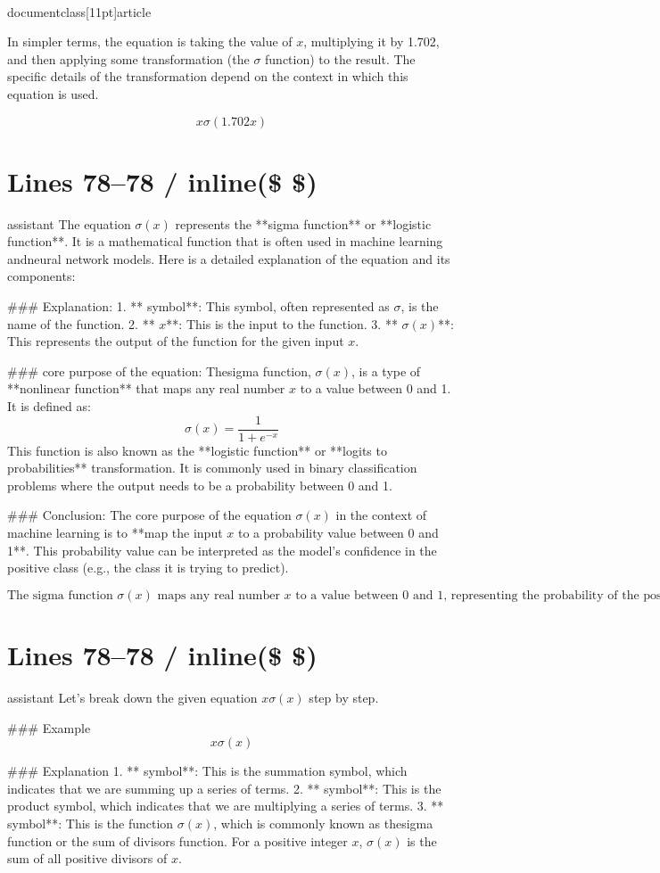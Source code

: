 \\documentclass[11pt]{article}
\begin{document}
In simpler terms, the equation is taking the value of \( x \), multiplying it by 1.702, and then applying some transformation (the \(\sigma\) function) to the result. The specific details of the transformation depend on the context in which this equation is used.

\[
\boxed{x \sigma(1.702 x)}
\]


\section*{Lines 78–78 / inline(\$ \$) }
assistant
The equation \(\sigma(x)\) represents the **sigma function** or **logistic function**. It is a mathematical function that is often used in machine learning andneural network models. Here is a detailed explanation of the equation and its components:

### Explanation:
1. ** symbol**: This symbol, often represented as \(\sigma\), is the name of the function.
2. ** \(x\)**: This is the input to the function.
3. ** \(\sigma(x)\)**: This represents the output of the function for the given input \(x\).

### core purpose of the equation:
Thesigma function, \(\sigma(x)\), is a type of **nonlinear function** that maps any real number \(x\) to a value between 0 and 1. It is defined as:
\[
\sigma(x) = \frac{1}{1 + e^{-x}}
\]
This function is also known as the **logistic function** or **logits to probabilities** transformation. It is commonly used in binary classification problems where the output needs to be a probability between 0 and 1.

### Conclusion:
The core purpose of the equation \(\sigma(x)\) in the context of machine learning is to **map the input \(x\) to a probability value between 0 and 1**. This probability value can be interpreted as the model's confidence in the positive class (e.g., the class it is trying to predict).

\[
\boxed{\text{The sigma function \(\sigma(x)\) maps any real number \(x\) to a value between 0 and 1, representing the probability of the positive class.}}
\]


\section*{Lines 78–78 / inline(\$ \$) }
assistant
Let's break down the given equation \( x\sigma(x) \) step by step.

### Example
\[ x\sigma(x) \]

### Explanation
1. ** symbol**: This is the summation symbol, which indicates that we are summing up a series of terms.
2. ** symbol**: This is the product symbol, which indicates that we are multiplying a series of terms.
3. ** symbol**: This is the function \( \sigma(x) \), which is commonly known as thesigma function or the sum of divisors function. For a positive integer \( x \), \( \sigma(x) \) is the sum of all positive divisors of \( x \).
\end{document}
